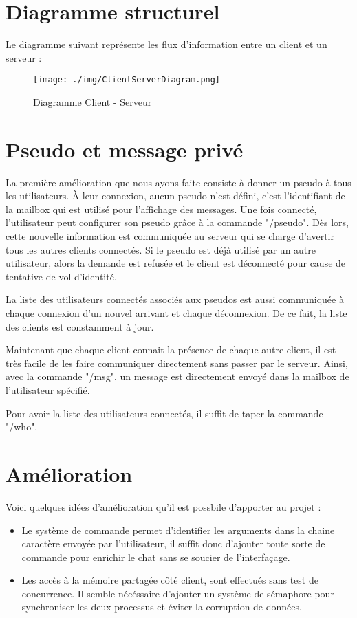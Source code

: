 \documentclass{article}
\begin{document}
	\section{Diagramme structurel}
	\par Le diagramme suivant représente les flux d'information entre un client et un serveur :
	\begin{figure}[h]
		\centering
		\texttt{[image: ./img/ClientServerDiagram.png]}
		\caption{Diagramme Client - Serveur} 
		\label{fig:diag_client_server}
	\end{figure}

	\newpage
	\section{Pseudo et message privé}
	\par La première amélioration que nous ayons faite consiste à donner un pseudo à tous les utilisateurs. À leur connexion, aucun pseudo n'est défini, c'est l'identifiant de la mailbox qui est utilisé pour l'affichage des messages. Une fois connecté, l'utilisateur peut configurer son pseudo grâce à la commande "/pseudo". Dès lors, cette nouvelle information est communiquée au serveur qui se charge d'avertir tous les autres clients connectés. Si le pseudo est déjà utilisé par un autre utilisateur, alors la demande est refusée et le client est déconnecté pour cause de tentative de vol d'identité.
	\par La liste des utilisateurs connectés associés aux pseudos est aussi communiquée à chaque connexion d'un nouvel arrivant et chaque déconnexion. De ce fait, la liste des clients est constamment à jour.
	\par Maintenant que chaque client connait la présence de chaque autre client, il est très facile de les faire communiquer directement sans passer par le serveur. Ainsi, avec la commande "/msg", un message est directement envoyé dans la mailbox de l'utilisateur spécifié.
	\par Pour avoir la liste des utilisateurs connectés, il suffit de taper la commande "/who".

	\section{Amélioration}
	\par Voici quelques idées d'amélioration qu'il est possbile d'apporter au projet : 
	\begin{itemize}\renewcommand{\labelitemi}{$\bullet$} 
		\item Le système de commande permet d'identifier les arguments dans la chaine caractère envoyée par l'utilisateur, il suffit donc d'ajouter toute sorte de commande pour enrichir le chat sans se soucier de l'interfaçage.
		\item Les accès à la mémoire partagée côté client, sont effectués sans test de concurrence. Il semble nécéssaire d'ajouter un système de sémaphore pour synchroniser les deux processus et éviter la corruption de données.
	\end{itemize}
\end{document}
